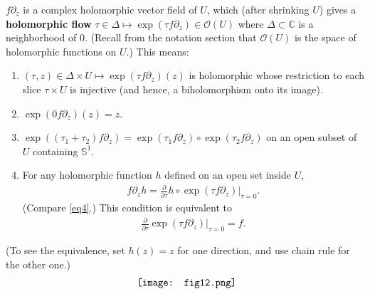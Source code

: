\documentclass[11pt,b5paper,notitlepage]{article}
\theoremstyle{definition}
\newtheorem{rem}[df]{Remark}
\theoremstyle{plain}
\newcommand{\fk}{\mathfrak}
\newcommand{\scr}{\mathscr}
\newcommand{\Cbb}{\mathbb C}
\newcommand{\Sbb}{{\mathbb S}}
\newcommand{\cl}{\mathrm{cl}}
\numberwithin{equation}{section}
\begin{document}
$f\partial_z$ is a complex holomorphic vector field of $U$, which (after shrinking  $U$) gives a \textbf{holomorphic flow} $\tau\in \Delta\mapsto \exp(\tau f\partial_z)\in\scr O(U)$ where $\Delta\subset\Cbb$ is a neighborhood of $0$. (Recall from the notation section that $\scr O(U)$ is the space of holomorphic functions on $U$.) This means:
\begin{enumerate}[label=(\arabic*)]
\item $(\tau,z)\in\Delta\times U\mapsto \exp(\tau f\partial_z)(z)$ is holomorphic whose restriction to each slice $\tau\times U$ is injective (and hence, a biholomorphism onto its image).
\item $\exp(0 f\partial_z)(z)=z$.
\item $\exp((\tau_1+\tau_2)f\partial_z)=\exp(\tau_1 f\partial_z)\circ\exp (\tau_2 f\partial_z)$ on an open subset of $U$ containing $\Sbb^1$.
\item For any holomorphic function $h$ defined on an open set inside $U$,
\begin{align}
f\partial_z h=\frac \partial{\partial\tau} h\circ \exp(\tau f\partial_z)\Big|_{\tau=0}.\label{eq7}
\end{align}
(Compare \eqref{eq4}.) This condition is equivalent to
\begin{align}
\frac \partial{\partial\tau}\exp(\tau f\partial_z)\Big|_{\tau=0}=f.\label{eq8}	
\end{align}
\end{enumerate}
(To see the equivalence, set $h(z)=z$ for one direction, and use chain rule for the other one.)
\begin{align*}
\vcenter{\hbox{{
			\texttt{[image: fig12.png]}}}}	
\end{align*}


\end{document}
